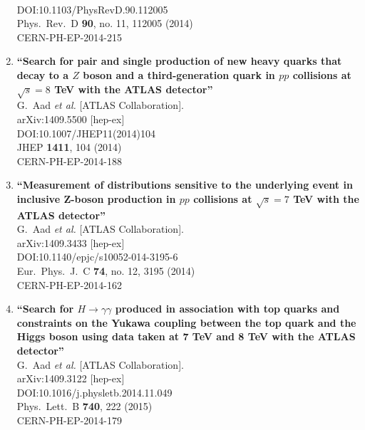 \documentclass{article}
\begin{document}
\begin{enumerate}
  \\{}DOI:10.1103/PhysRevD.90.112005
  \\{}Phys.\ Rev.\ D {\bf 90}, no. 11, 112005 (2014)
  \\{}CERN-PH-EP-2014-215
\item%
{\bf ``Search for pair and single production of new heavy quarks that decay to a $Z$ boson and a third-generation quark in $pp$ collisions at $\sqrt{s}=8$ TeV with the ATLAS detector''}
  \\{}G.~Aad {\it et al.} [ATLAS Collaboration].
  \\{}arXiv:1409.5500 [hep-ex]
  \\{}DOI:10.1007/JHEP11(2014)104
  \\{}JHEP {\bf 1411}, 104 (2014)
  \\{}CERN-PH-EP-2014-188
\item%
{\bf ``Measurement of distributions sensitive to the underlying event in inclusive Z-boson production in $pp$ collisions at $\sqrt{s}=7$ TeV with the ATLAS detector''}
  \\{}G.~Aad {\it et al.} [ATLAS Collaboration].
  \\{}arXiv:1409.3433 [hep-ex]
  \\{}DOI:10.1140/epjc/s10052-014-3195-6
  \\{}Eur.\ Phys.\ J.\ C {\bf 74}, no. 12, 3195 (2014)
  \\{}CERN-PH-EP-2014-162
\item%
{\bf ``Search for $H \to \gamma\gamma$ produced in association with top quarks and constraints on the Yukawa coupling between the top quark and the Higgs boson using data taken at 7 TeV and 8 TeV with the ATLAS detector''}
  \\{}G.~Aad {\it et al.} [ATLAS Collaboration].
  \\{}arXiv:1409.3122 [hep-ex]
  \\{}DOI:10.1016/j.physletb.2014.11.049
  \\{}Phys.\ Lett.\ B {\bf 740}, 222 (2015)
  \\{}CERN-PH-EP-2014-179

\end{enumerate}
\end{document}

